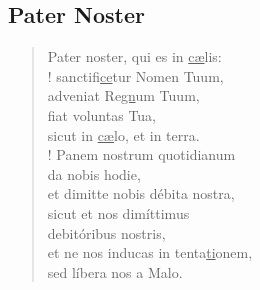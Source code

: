 \subsection*{Pater Noster}
\vspace{-0.5em}

\begin{verse}
        Pater noster, qui es in \ul{cæ}lis:
%
\\!     sanctifi\ul{ce}tur Nomen Tuum,
\\      adveniat Re\ul{gn}um Tuum,
\\      fiat voluntas Tua,
\\\vin      sicut in \ul{cæ}lo, et in terra.
%
\\!     Panem nostrum quotidianum
\\\vin      da nobis hodie,
\\      et dimitte nobis d\'ebita nostra,
\\\vin      sicut et nos dim\'ittimus
\\\vin      debit\'oribus nostris,
\\      et ne nos inducas in tenta\ul{ti}onem,
\\      sed l\'ibera nos a Malo.
\end{verse}